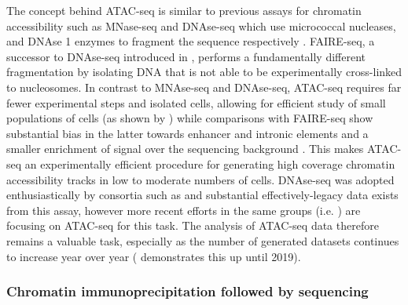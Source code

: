 The concept behind ATAC-seq is similar to previous assays for chromatin accessibility such as MNase-seq and DNAse-seq which use micrococcal nucleases, and DNAse 1 enzymes to fragment the sequence respectively \cite{Bell2011a}. FAIRE-seq, a successor to DNAse-seq introduced in \textcite{Giresi2007}, performs a fundamentally different fragmentation by isolating DNA that is not able to be experimentally cross-linked to nucleosomes. In contrast to MNAse-seq and DNAse-seq, ATAC-seq requires far fewer experimental steps and isolated cells, allowing for efficient study of small populations of cells (as shown by \textcite{Buenrostro2015a}) while comparisons with FAIRE-seq show substantial bias in the latter towards enhancer and intronic elements and a smaller enrichment of signal over the sequencing background \cite{Tsompana2014}. This makes ATAC-seq an experimentally efficient procedure for generating high coverage chromatin accessibility tracks in low to moderate numbers of cells. DNAse-seq was adopted enthusiastically by consortia such as \textcite{ENCODEProjectConsortium2012} and substantial effectively-legacy data exists from this assay, however more recent efforts in the same groups (i.e. \textcite{Moore2020}) are focusing on ATAC-seq for this task. The analysis of ATAC-seq data therefore remains a valuable task, especially as the number of generated datasets continues to increase year over year (\textcite{Yan2020a} demonstrates this up until 2019).

\subsubsection{Chromatin immunoprecipitation followed by sequencing}

